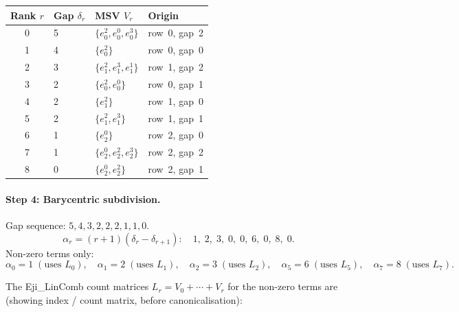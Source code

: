 \documentclass[11pt,a4paper]{article}
\newcommand{\eji}[2]{e^{#1}_{#2}}           %
\begin{document}
\begin{center}
\small
\renewcommand{\arraystretch}{1.2}
\begin{tabular}{clll}
  \toprule
  Rank $r$ & Gap $\delta_r$ & MSV $V_r$ & Origin \\
  \midrule
  0 & 5 & $\{\eji{2}{0}, \eji{0}{0}, \eji{3}{0}\}$ & row~0, gap~2 \\
  1 & 4 & $\{\eji{2}{0}\}$                           & row~0, gap~0 \\
  2 & 3 & $\{\eji{2}{1}, \eji{3}{1}, \eji{1}{1}\}$  & row~1, gap~2 \\
  3 & 2 & $\{\eji{2}{0}, \eji{0}{0}\}$               & row~0, gap~1 \\
  4 & 2 & $\{\eji{2}{1}\}$                            & row~1, gap~0 \\
  5 & 2 & $\{\eji{2}{1}, \eji{3}{1}\}$               & row~1, gap~1 \\
  6 & 1 & $\{\eji{0}{2}\}$                            & row~2, gap~0 \\
  7 & 1 & $\{\eji{0}{2}, \eji{2}{2}, \eji{3}{2}\}$  & row~2, gap~2 \\
  8 & 0 & $\{\eji{0}{2}, \eji{2}{2}\}$               & row~2, gap~1 \\
  \bottomrule
\end{tabular}
\end{center}

\paragraph{Step 4: Barycentric subdivision.}
Gap sequence: $5, 4, 3, 2, 2, 2, 1, 1, 0$.
\[
  \alpha_r = (r{+}1)(\delta_r - \delta_{r+1}): \quad
  1,\; 2,\; 3,\; 0,\; 0,\; 6,\; 0,\; 8,\; 0.
\]
Non-zero terms only:
\[
  \alpha_0=1\;(\text{uses }L_0),\quad
  \alpha_1=2\;(\text{uses }L_1),\quad
  \alpha_2=3\;(\text{uses }L_2),\quad
  \alpha_5=6\;(\text{uses }L_5),\quad
  \alpha_7=8\;(\text{uses }L_7).
\]

The Eji\_LinComb count matrices $L_r = V_0 + \cdots + V_r$ for the non-zero terms are
(showing index / count matrix, before canonicalisation):
\end{document}

